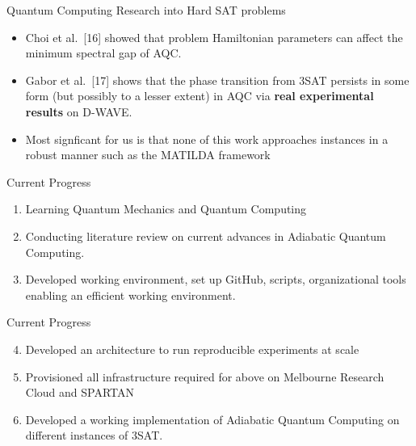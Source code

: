 \documentclass[
  ignorenonframetext,
]{beamer}
\providecommand{\tightlist}{%
  \setlength{\itemsep}{0pt}\setlength{\parskip}{0pt}}
\begin{document}
\begin{frame}{Quantum Computing Research into Hard SAT problems}
\protect\hypertarget{quantum-computing-research-into-hard-sat-problems-2}{}

\begin{itemize}[<+->]
\tightlist
\item
  Choi et al.~{[}16{]} showed that problem Hamiltonian parameters can
  affect the minimum spectral gap of AQC.
\item
  Gabor et al.~{[}17{]} shows that the phase transition from 3SAT
  persists in some form (but possibly to a lesser extent) in AQC via
  \textbf{real experimental results} on D-WAVE.
\item
  Most signficant for us is that none of this work approaches instances
  in a robust manner such as the MATILDA framework
\end{itemize}

\end{frame}

\begin{frame}{Current Progress}
\protect\hypertarget{current-progress}{}

\begin{enumerate}[<+->]
\tightlist
\item
  Learning Quantum Mechanics and Quantum Computing
\item
  Conducting literature review on current advances in Adiabatic Quantum
  Computing.
\item
  Developed working environment, set up GitHub, scripts, organizational
  tools enabling an efficient working environment.
\end{enumerate}

\end{frame}

\begin{frame}{Current Progress}
\protect\hypertarget{current-progress-1}{}

\begin{enumerate}[<+->]
\setcounter{enumi}{3}
\tightlist
\item
  Developed an architecture to run reproducible experiments at scale
\item
  Provisioned all infrastructure required for above on Melbourne
  Research Cloud and SPARTAN
\item
  Developed a working implementation of Adiabatic Quantum Computing on
  different instances of 3SAT.
\end{enumerate}

\end{frame}
\end{document}

